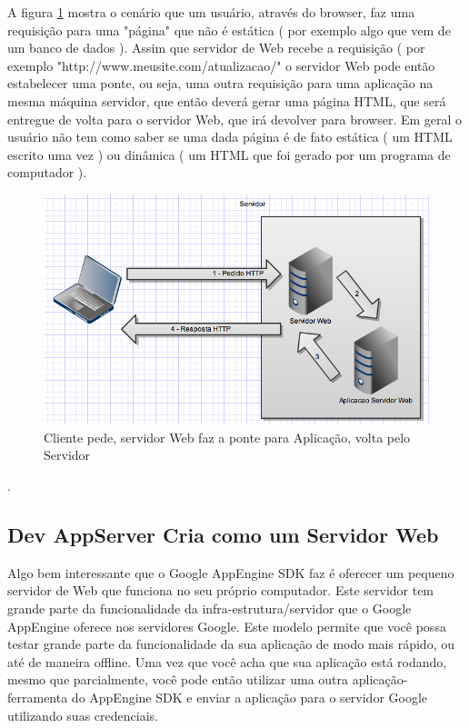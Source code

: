 \documentclass[a4paper]{article}
\begin{document}
A figura \ref{fig:image-servidor-web-app} mostra o cenário que um usuário, através do browser, faz uma requisição para uma "página" que não é estática ( por exemplo algo que vem de um banco de dados ). Assim que servidor de Web recebe a requisição ( por exemplo "http://www.meusite.com/atualizacao/" o servidor Web pode então estabelecer uma ponte, ou seja, uma outra requisição para uma aplicação na mesma máquina servidor, que então deverá gerar uma página HTML, que será entregue de volta para o servidor Web, que irá devolver para browser. Em geral o usuário não tem como saber se uma dada página é de fato estática ( um HTML escrito uma vez ) ou dinâmica ( um HTML que foi gerado por um programa de computador ). 

\begin{figure}[!h]
\centering
\includegraphics[width=4.5in]{image-servidor-web-app}
\caption{Cliente pede, servidor Web faz a ponte para Aplicação, volta pelo Servidor }
\label{fig:image-servidor-web-app}
\end{figure}.


\subsection {Dev AppServer Cria como um Servidor Web } 

Algo bem interessante que o Google AppEngine SDK faz é oferecer um pequeno servidor de Web que funciona no seu próprio computador. Este servidor tem grande parte da funcionalidade da infra-estrutura/servidor que o Google AppEngine oferece nos servidores Google. Este modelo permite que você possa testar grande parte da funcionalidade da sua aplicação de modo mais rápido, ou até de maneira offline. Uma vez que você acha que sua aplicação está rodando, mesmo que parcialmente, você pode então utilizar uma outra aplicação-ferramenta do AppEngine SDK e enviar a aplicação para o servidor Google utilizando suas credenciais.
\end{document}
